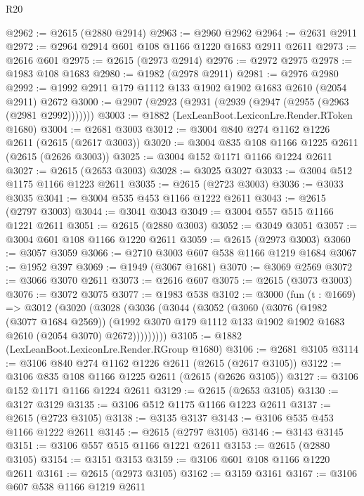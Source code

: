 \begin{lexlean}{R20}
\begin{coremodule}
{{{{{{{{{{{{{{{{{{{{{{{{{{{{{{{{{{{{{{{{{{{{{{{{{{{{{{{{{{{{{{{@2962 := @2615 (@2880 @2914)
@2963 := @2960 @2962
@2964 := @2631 @2911
@2972 := @2964 @2914 @601 @108 @1166 @1220 @1683 @2911 @2611
@2973 := @2616 @601
@2975 := @2615 (@2973 @2914)
@2976 := @2972 @2975
@2978 := @1983 @108 @1683
@2980 := @1982 (@2978 @2911)
@2981 := @2976 @2980
@2992 := @1992 @2911 @179 @1112 @133 @1902 @1902 @1683 @2610 (@2054 @2911) @2672
@3000 := @2907 (@2923 (@2931 (@2939 (@2947 (@2955 (@2963 (@2981 @2992)))))))
@3003 := @1882 (LexLeanBoot.LexiconLre.Render.RToken @1680)
@3004 := @2681 @3003
@3012 := @3004 @840 @274 @1162 @1226 @2611 (@2615 (@2617 @3003))
@3020 := @3004 @835 @108 @1166 @1225 @2611 (@2615 (@2626 @3003))
@3025 := @3004 @152 @1171 @1166 @1224 @2611
@3027 := @2615 (@2653 @3003)
@3028 := @3025 @3027
@3033 := @3004 @512 @1175 @1166 @1223 @2611
@3035 := @2615 (@2723 @3003)
@3036 := @3033 @3035
@3041 := @3004 @535 @453 @1166 @1222 @2611
@3043 := @2615 (@2797 @3003)
@3044 := @3041 @3043
@3049 := @3004 @557 @515 @1166 @1221 @2611
@3051 := @2615 (@2880 @3003)
@3052 := @3049 @3051
@3057 := @3004 @601 @108 @1166 @1220 @2611
@3059 := @2615 (@2973 @3003)
@3060 := @3057 @3059
@3066 := @2710 @3003 @607 @538 @1166 @1219 @1684
@3067 := @1952 @397
@3069 := @1949 (@3067 @1681)
@3070 := @3069 @2569
@3072 := @3066 @3070 @2611
@3073 := @2616 @607
@3075 := @2615 (@3073 @3003)
@3076 := @3072 @3075
@3077 := @1983 @538
@3102 := @3000
    (fun (t : @1669) =>
    @3012
      (@3020
        (@3028
          (@3036
            (@3044
              (@3052
                (@3060
                  (@3076
                    (@1982 (@3077 @1684 @2569))
                    (@1992
                      @3070
                      @179
                      @1112
                      @133
                      @1902
                      @1902
                      @1683
                      @2610
                      (@2054 @3070)
                      @2672)))))))))
@3105 := @1882 (LexLeanBoot.LexiconLre.Render.RGroup @1680)
@3106 := @2681 @3105
@3114 := @3106 @840 @274 @1162 @1226 @2611 (@2615 (@2617 @3105))
@3122 := @3106 @835 @108 @1166 @1225 @2611 (@2615 (@2626 @3105))
@3127 := @3106 @152 @1171 @1166 @1224 @2611
@3129 := @2615 (@2653 @3105)
@3130 := @3127 @3129
@3135 := @3106 @512 @1175 @1166 @1223 @2611
@3137 := @2615 (@2723 @3105)
@3138 := @3135 @3137
@3143 := @3106 @535 @453 @1166 @1222 @2611
@3145 := @2615 (@2797 @3105)
@3146 := @3143 @3145
@3151 := @3106 @557 @515 @1166 @1221 @2611
@3153 := @2615 (@2880 @3105)
@3154 := @3151 @3153
@3159 := @3106 @601 @108 @1166 @1220 @2611
@3161 := @2615 (@2973 @3105)
@3162 := @3159 @3161
@3167 := @3106 @607 @538 @1166 @1219 @2611
}}}}}}}}}}}}}}}}}}}}}}}}}}}}}}}}}}}}}}}}}}}}}}}}}}}}}}}}}}}}}}}
\end{coremodule}
\end{lexlean}
